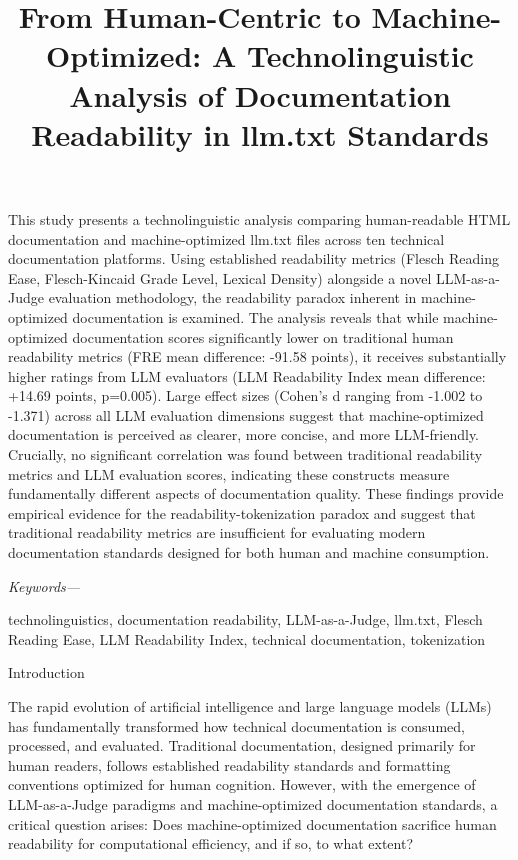 \documentclass[10pt,conference,a4paper]{IEEEtran}
\title{%
    \normalfont\fontsize{24pt}{28.8pt}\selectfont\bfseries
    From Human-Centric to Machine-Optimized: A Technolinguistic Analysis of Documentation Readability in llm.txt Standards%
}
\author{%
    \IEEEauthorblockN{Yehezkiel Gunawan}
    \IEEEauthorblockA{Department of Information System\\
    Binus University\\
    Jakarta, Indonesia\\
    yehezkiel.gunawan@binus.ac.id}
}
\makeatletter
\renewenvironment{abstract}{%
    \normalfont\fontsize{9pt}{10.8pt}\selectfont\bfseries
    \noindent\ignorespaces
}{%
    \par\addvspace{10pt}%
}
\newenvironment{keywords}{%
    \normalfont\itshape\fontsize{10pt}{12pt}\selectfont
    \noindent\hspace{13.7pt}Keywords---\ignorespaces
}{%
    \par\addvspace{6pt}%
}
\let\oldsection\section
\renewcommand{\section}{%
    \@ifstar{\sectionStar}{\sectionNoStar}%
}
\newcommand{\sectionStar}[1]{%
    \oldsection*{#1}%
    \vspace{-4pt}%
}
\newcommand{\sectionNoStar}[1]{%
    \oldsection{#1}%
    \vspace{-4pt}%
}
\makeatother
\begin{document}
\maketitle

\begin{abstract}
This study presents a technolinguistic analysis comparing human-readable HTML documentation and machine-optimized llm.txt files across ten technical documentation platforms. Using established readability metrics (Flesch Reading Ease, Flesch-Kincaid Grade Level, Lexical Density) alongside a novel LLM-as-a-Judge evaluation methodology, the readability paradox inherent in machine-optimized documentation is examined. The analysis reveals that while machine-optimized documentation scores significantly lower on traditional human readability metrics (FRE mean difference: -91.58 points), it receives substantially higher ratings from LLM evaluators (LLM Readability Index mean difference: +14.69 points, p=0.005). Large effect sizes (Cohen's d ranging from -1.002 to -1.371) across all LLM evaluation dimensions suggest that machine-optimized documentation is perceived as clearer, more concise, and more LLM-friendly. Crucially, no significant correlation was found between traditional readability metrics and LLM evaluation scores, indicating these constructs measure fundamentally different aspects of documentation quality. These findings provide empirical evidence for the readability-tokenization paradox and suggest that traditional readability metrics are insufficient for evaluating modern documentation standards designed for both human and machine consumption.
\end{abstract}

\begin{keywords}
technolinguistics, documentation readability, LLM-as-a-Judge, llm.txt, Flesch Reading Ease, LLM Readability Index, technical documentation, tokenization
\end{keywords}

\IEEEpeerreviewmaketitle

\section{Introduction}

The rapid evolution of artificial intelligence and large language models (LLMs) has fundamentally transformed how technical documentation is consumed, processed, and evaluated. Traditional documentation, designed primarily for human readers, follows established readability standards and formatting conventions optimized for human cognition. However, with the emergence of LLM-as-a-Judge paradigms and machine-optimized documentation standards, a critical question arises: Does machine-optimized documentation sacrifice human readability for computational efficiency, and if so, to what extent?
\end{document}
